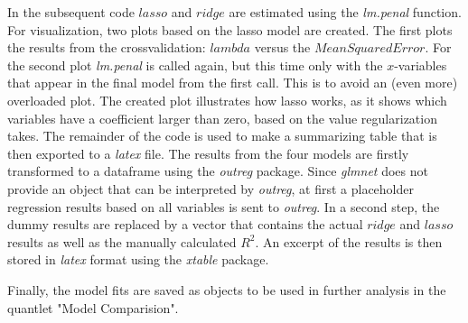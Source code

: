 In the subsequent code $lasso$ and $ridge$ are estimated using the \textit{lm.penal} function.  For visualization, two plots based on the lasso model are created. The first plots the results from the crossvalidation: $lambda$ versus the $Mean Squared Error$. For the second plot \textit{lm.penal} is called again, but this time only with the $x$-variables that appear in the final model from the first call. This is to avoid an (even more) overloaded plot. The created plot illustrates how lasso works, as it shows which variables have a coefficient larger than zero, based on the value  regularization takes. 
The remainder of the code is used to make a summarizing table that is then exported to  a \textit{latex} file. The results from the four models are firstly transformed to a dataframe using the \textit{outreg} package. Since \textit{glmnet} does not provide  an object that can be interpreted by \textit{outreg}, at first a placeholder regression results based on all variables is sent to \textit{outreg}. In a second step, the dummy results are replaced by a vector that contains the actual $ridge$ and $lasso$ results as well as the manually calculated $R^{2}$.  An excerpt of the results is then stored in \textit{latex} format using the \textit{xtable} package. 

Finally, the model fits are saved as objects to be used in further analysis in the quantlet "Model Comparision". 

